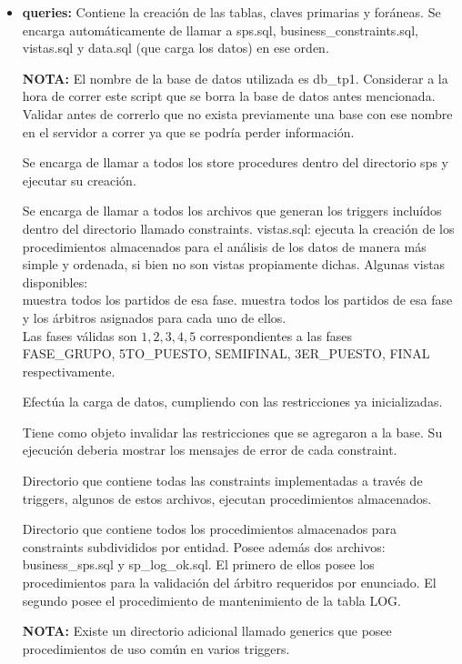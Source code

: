 \documentclass[11pt, a4paper, spanish]{article}
\begin{document}
	\begin{itemize}
		\item{\textbf{queries:}}
				Contiene la creaci\'on de las tablas, claves primarias y for\'aneas. 
				Se encarga autom\'aticamente de llamar a sps.sql, business\_constraints.sql, vistas.sql y data.sql (que carga los datos) en ese orden.

				\textbf{NOTA:} El nombre de la base de datos utilizada es db\_tp1. Considerar a la hora de correr este script que se borra la base de datos antes mencionada. 
				Validar antes de correrlo que no exista previamente una base con ese nombre en el servidor a correr ya que se podr\'ia perder informaci\'on.

			 Se encarga de llamar a todos los store procedures dentro del directorio sps y ejecutar su creaci\'on.

			 Se encarga de llamar a todos los archivos que generan los triggers inclu\'idos dentro del directorio llamado constraints.
				vistas.sql: ejecuta la creaci\'on de los procedimientos almacenados para el an\'alisis de los datos de manera m\'as simple y ordenada, si bien no son vistas propiamente dichas. 
				Algunas vistas disponibles:\\

				     muestra todos los partidos de esa fase.
				     muestra todos los partidos de esa fase y los \'arbitros asignados para cada uno de ellos.\\

					Las fases v\'alidas son $1,2,3,4,5$ correspondientes a las fases\\
					FASE\_GRUPO, 5TO\_PUESTO, SEMIFINAL, 3ER\_PUESTO, FINAL respectivamente.

			 Efect\'ua la carga de datos, cumpliendo con las restricciones ya inicializadas.

			 Tiene como objeto invalidar las restricciones que se agregaron a la base. Su ejecuci\'on deberia mostrar los mensajes de error de cada constraint.

		    	Directorio que contiene todas las constraints implementadas a trav\'es de triggers, 
				algunos de estos archivos, ejecutan procedimientos almacenados.

		    	 Directorio que contiene todos los procedimientos almacenados para constraints subdivididos por entidad.
				Posee adem\'as dos archivos: business\_sps.sql y sp\_log\_ok.sql. El primero de ellos posee los procedimientos para la validaci\'on del \'arbitro requeridos por enunciado.
				El segundo posee el procedimiento de mantenimiento de la tabla LOG.

			    	\textbf{NOTA:} Existe un directorio adicional llamado generics que posee procedimientos de uso com\'un en varios triggers.

	\end{itemize}
\newpage 
\end{document}
